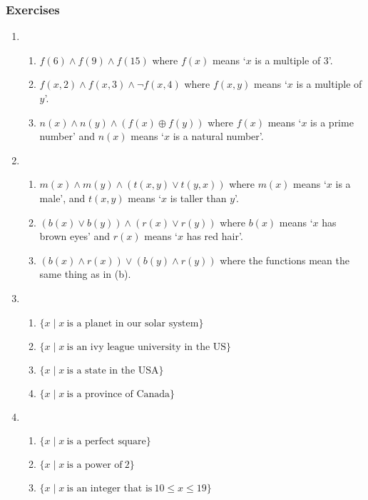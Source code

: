 \documentclass[a4paper, 11pt]{article}
\begin{document}
\subsubsection{Exercises}
\begin{enumerate}
  \item
        \begin{enumerate}
          \item $f(6) \wedge f(9) \wedge f(15)$ where $f(x)$ means `$x$ is a multiple of 3'.
          \item $f(x, 2) \wedge f(x, 3) \wedge \neg f(x, 4)$ where $f(x, y)$ means `$x$ is a multiple of $y$'.
          \item $n(x) \wedge n(y) \wedge (f(x) \oplus f(y))$ where $f(x)$ means `$x$ is a prime number' and $n(x)$ means `$x$ is a natural number'.
        \end{enumerate}
  \item
        \begin{enumerate}
          \item $m(x) \wedge m(y) \wedge (t(x,y) \vee t(y, x))$ where $m(x)$ means `$x$ is a male', and $t(x,y)$ means `$x$ is taller than $y$'.
          \item $(b(x) \vee b(y)) \wedge (r(x) \vee r(y))$ where $b(x)$ means `$x$ has brown eyes' and $r(x)$ means `$x$ has red hair'.
          \item $(b(x) \wedge r(x)) \vee (b(y) \wedge r(y))$ where the functions mean the same thing as in (b).
        \end{enumerate}
  \item
        \begin{enumerate}
          \item $\{x \mid x~ \text{is a planet in our solar system}\}$
          \item $\{x \mid x~ \text{is an ivy league university in the US}\}$
          \item $\{x \mid x~ \text{is a state in the USA}\}$
          \item $\{x \mid x~ \text{is a province of Canada}\}$
        \end{enumerate}
  \item
        \begin{enumerate}
          \item $\{x \mid x~ \text{is a perfect square}\}$
          \item $\{x \mid x~ \text{is a power of} ~2\}$
          \item $\{x \mid x ~\text{is an integer that is} ~10 \leq x \leq 19 \}$

\end{enumerate}
\end{enumerate}
\end{document}
